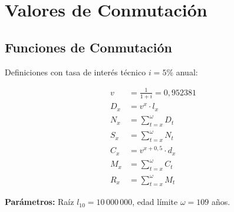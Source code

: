 
\section{Valores de Conmutación}

\subsection{Funciones de Conmutación}

Definiciones con tasa de interés técnico $i = 5\%$ anual:

\begin{align}
    v &= \frac{1}{1+i} = 0{,}952381 \\[6pt]
    D_x &= v^x \cdot l_x \\
    N_x &= \sum_{t=x}^{\omega} D_t \\
    S_x &= \sum_{t=x}^{\omega} N_t \\[6pt]
    C_x &= v^{x+0{,}5} \cdot d_x \\
    M_x &= \sum_{t=x}^{\omega} C_t \\
    R_x &= \sum_{t=x}^{\omega} M_t
\end{align}

\textbf{Parámetros:} Raíz $l_{10} = 10\,000\,000$, edad límite $\omega = 109$ años.










